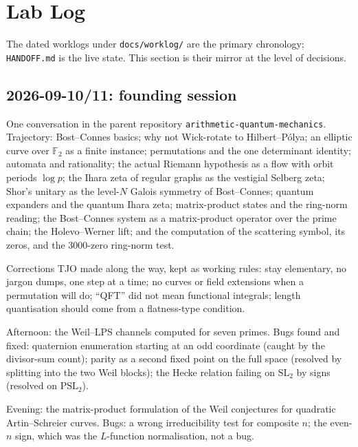 
\section{Lab Log}

The dated worklogs under \texttt{docs/worklog/} are the primary chronology;
\texttt{HANDOFF.md} is the live state. This section is their mirror at the
level of decisions.

\subsection*{2026-09-10/11: founding session}

One conversation in the parent repository
\texttt{arithmetic-quantum-mechanics}. Trajectory: Bost--Connes basics; why
not Wick-rotate to Hilbert--P\'olya; an elliptic curve over $\mathbb F_2$ as a
finite instance; permutations and the one determinant identity; automata and
rationality; the actual Riemann hypothesis as a flow with orbit periods
$\log p$; the Ihara zeta of regular graphs as the vestigial Selberg zeta;
Shor's unitary as the level-$N$ Galois symmetry of Bost--Connes; quantum
expanders and the quantum Ihara zeta; matrix-product states and the ring-norm
reading; the Bost--Connes system as a matrix-product operator over the prime
chain; the Holevo--Werner lift; and the computation of the scattering symbol,
its zeros, and the $3000$-zero ring-norm test.

Corrections TJO made along the way, kept as working rules: stay elementary,
no jargon dumps, one step at a time; no curves or field extensions when a
permutation will do; ``QFT'' did not mean functional integrals; length
quantisation should come from a flatness-type condition.

Afternoon: the Weil--LPS channels computed for seven primes. Bugs found and
fixed: quaternion enumeration starting at an odd coordinate (caught by the
divisor-sum count); parity as a second fixed point on the full space
(resolved by splitting into the two Weil blocks); the Hecke relation failing
on $\mathrm{SL}_2$ by signs (resolved on $\mathrm{PSL}_2$).

Evening: the matrix-product formulation of the Weil conjectures for quadratic
Artin--Schreier curves. Bugs: a wrong irreducibility test for composite $n$;
the even-$n$ sign, which was the $L$-function normalisation, not a bug.

